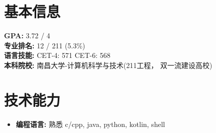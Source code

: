 \documentclass{resume}
\begin{document}









\section{基本信息}
\textbf{GPA: } 3.72 / 4 \\
\textbf{专业排名: } 12 / 211 (5.3\%)  \\
\textbf{语言技能: } CET-4: 571 \quad CET-6: 568 \\
\textbf{本科院校: } 南昌大学-计算机科学与技术(211工程， 双一流建设高校) 


\section{技术能力}
\begin{itemize}
  \item \textbf{编程语言: } 熟悉 c/cpp, java, python, kotlin, shell
\end{itemize}
\end{document}
